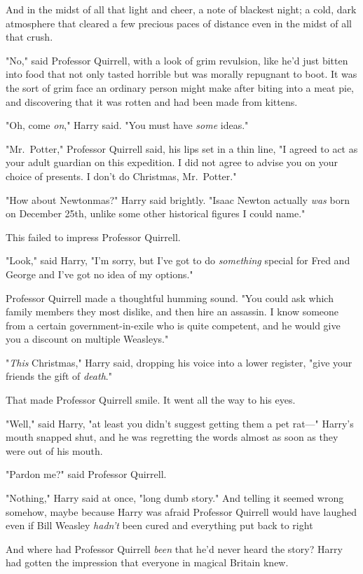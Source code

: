 And in the midst of all that light and cheer, a note of blackest night; a cold,
dark atmosphere that cleared a few precious paces of distance even in the midst
of all that crush.

"No," said Professor Quirrell, with a look of grim revulsion, like he'd just
bitten into food that not only tasted horrible but was morally repugnant to
boot. It was the sort of grim face an ordinary person might make after biting
into a meat pie, and discovering that it was rotten and had been made from
kittens.

"Oh, come \emph{on}," Harry said. "You must have \emph{some} ideas."

"Mr.~Potter," Professor Quirrell said, his lips set in a thin line, "I agreed
to act as your adult guardian on this expedition. I did not agree to advise you
on your choice of presents. I don't do Christmas, Mr.~Potter."

"How about Newtonmas?" Harry said brightly. "Isaac Newton actually \emph{was}
born on December 25th, unlike some other historical figures I could name."

This failed to impress Professor Quirrell.

"Look," said Harry, "I'm sorry, but I've got to do \emph{something} special for
Fred and George and I've got no idea of my options."

Professor Quirrell made a thoughtful humming sound. "You could ask which family
members they most dislike, and then hire an assassin. I know someone from a
certain government-in-exile who is quite competent, and he would give you a
discount on multiple Weasleys."

"\emph{This} Christmas," Harry said, dropping his voice into a lower register,
"give your friends the gift{\el} of \emph{death}."

That made Professor Quirrell smile. It went all the way to his eyes.

"Well," said Harry, "at least you didn't suggest getting them a pet rat---"
Harry's mouth snapped shut, and he was regretting the words almost as soon as
they were out of his mouth.

"Pardon me?" said Professor Quirrell.

"Nothing," Harry said at once, "long dumb story." And telling it seemed wrong
somehow, maybe because Harry was afraid Professor Quirrell would have laughed
even if Bill Weasley \emph{hadn't} been cured and everything put back to
right{\el}

And where had Professor Quirrell \emph{been} that he'd never heard the story?
Harry had gotten the impression that everyone in magical Britain knew.


